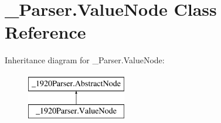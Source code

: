 \hypertarget{class__1920_parser_1_1_value_node}{}\section{\+\_\+Parser.\+Value\+Node Class Reference}
\label{class__1920_parser_1_1_value_node}
Inheritance diagram for \+\_\+Parser.\+Value\+Node\+:\begin{figure}[H]
\begin{center}
\leavevmode
\includegraphics[height=2.000000cm]{class__1920_parser_1_1_value_node}
\end{center}
\end{figure}
